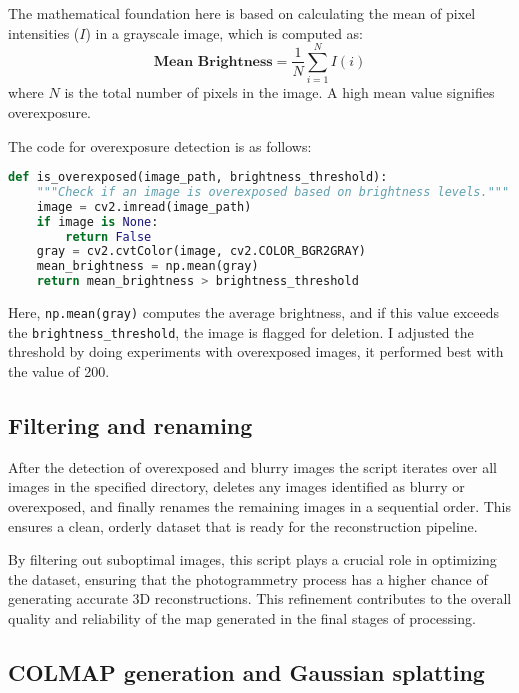 The mathematical foundation here is based on calculating the mean of pixel intensities (\(I\)) in a grayscale image, which is computed as:
\begin{equation}
    \textbf{Mean Brightness} = \frac{1}{N}\sum_{i=1}^{N} I\left ( i \right )
\end{equation}
where \(N\) is the total number of pixels in the image. A high mean value signifies overexposure.

The code for overexposure detection is as follows:

\FloatBarrier
\begin{lstlisting}[language=python,frame=single,float=!ht]
def is_overexposed(image_path, brightness_threshold):
    """Check if an image is overexposed based on brightness levels."""
    image = cv2.imread(image_path)
    if image is None:
        return False
    gray = cv2.cvtColor(image, cv2.COLOR_BGR2GRAY)
    mean_brightness = np.mean(gray)
    return mean_brightness > brightness_threshold
\end{lstlisting}
\FloatBarrier
Here, \verb|np.mean(gray)| computes the average brightness, and if this value exceeds the \verb|brightness_threshold|, the image is flagged for deletion. I adjusted the threshold by doing experiments with overexposed images, it performed best with the value of 200.

\subsection{Filtering and renaming}

After the detection of overexposed and blurry images the script iterates over all images in the specified directory, deletes any images identified as blurry or overexposed, and finally renames the remaining images in a sequential order. This ensures a clean, orderly dataset that is ready for the reconstruction pipeline.

By filtering out suboptimal images, this script plays a crucial role in optimizing the dataset, ensuring that the photogrammetry process has a higher chance of generating accurate 3D reconstructions. This refinement contributes to the overall quality and reliability of the map generated in the final stages of processing.

\subsection{COLMAP generation and Gaussian splatting}

